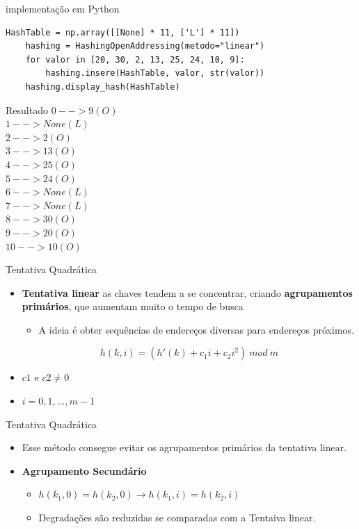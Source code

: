 \documentclass{beamer}
\begin{document}
\begin{frame}[fragile]{implementação em Python} 
\centering\footnotesize
\begin{lstlisting}[style=PythonStyle]
    HashTable = np.array([[None] * 11, ['L'] * 11])
    hashing = HashingOpenAddressing(metodo="linear")
    for valor in [20, 30, 2, 13, 25, 24, 10, 9]:
        hashing.insere(HashTable, valor, str(valor))
    hashing.display_hash(HashTable)
\end{lstlisting}
\begin{block}{Resultado}
\tiny
$0 --> 9 (O)$\\
$1 --> None (L)$\\
$2 --> 2 (O)$\\
$3 --> 13 (O)$\\
$4 --> 25 (O)$\\
$5 --> 24 (O)$\\
$6 --> None (L)$\\
$7 --> None (L)$\\
$8 --> 30 (O)$\\
$9 --> 20 (O)$\\
$10 --> 10 (O)$\\
\end{block}

\end{frame}

\begin{frame}{Tentativa Quadrática}
\begin{itemize}
 \item \textbf{Tentativa linear} as chaves tendem a se concentrar, criando \textbf{agrupamentos primários}, que aumentam muito o tempo de busca
 \begin{itemize}
  \item A ideia é obter sequências de endereços diversas para endereços próximos.
 \end{itemize}
 $$h(k,i) = (h'(k) + c_1i + c_2i^2)\ mod \ m$$
 \item $c1$ e $c2 \neq 0$
 \item $i  = 0,1,...,m-1$

\end{itemize}
\end{frame}

\begin{frame}{Tentativa Quadrática}
\begin{itemize}
 \item Esse método consegue evitar os agrupamentos primários da tentativa linear.
 \item \textbf{Agrupamento Secundário}
 \begin{itemize}
  \item $h(k_1,0) = h(k_2,0) \rightarrow h(k_1,i) = h(k_2,i)$
  \item Degradações são reduzidas se comparadas com a Tentaiva linear.
 \end{itemize}
\end{itemize}
\end{frame}
\end{document}

